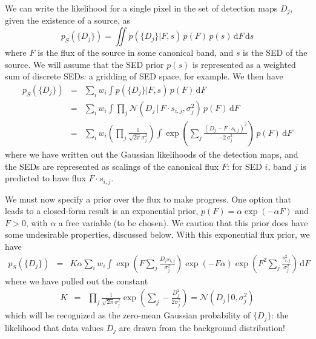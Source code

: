 \documentclass[letterpaper,preprint]{aastex62}
\newcommand{\gaussianN}{\mathcal{N}}
\newcommand{\gaussian}[1]{\gaussianN\!\left(#1\right)}
\newcommand{\dd}{\mathrm{d}}
\begin{document}
We can write the likelihood for a single pixel in the set of detection
maps $D_j$, given the existence of a source, as
\begin{equation}
  p_S(\{ D_j \}) = \iint p(\{ D_j \} | F, s) \, p(F) \, p(s) \, \dd F \, \dd s
\end{equation}
where $F$ is the flux of the source in some canonical band, and $s$ is
the SED of the source.  We will assume that the SED prior $p(s)$ is
represented as a weighted sum of discrete SEDs: a gridding of SED
space, for example.  We then have
\begin{eqnarray}
  p_S(\{ D_j \})
  &=&
  \sum_{i} w_i \int p(\{ D_j \} | F, s) \, p(F) \, \dd F
  \\
  &=&
  \sum_i w_i \int \prod_j \gaussian{D_j \,|\, F \cdot s_{i,j}, \sigma_j^2} \, p(F) \, \dd F
  \\
  &=&
  \sum_i w_i 
  \left( \prod_j \frac{1}{\sqrt{2 \pi} \sigma_j^2} \right)
  \int 
    \exp{ \left( \sum_j \frac{(D_j - F \cdot s_{i,j})^2}{-2 \, \sigma_j^2} \right) }
    \, p(F) \, \dd F
\end{eqnarray}
%
where we have written out the Gaussian likelihoods of the detection
maps, and the SEDs are represented as scalings of the canonical flux
$F$: for SED $i$, band $j$ is predicted to have flux $F \cdot
s_{i,j}$.

We must now specify a prior over the flux to make progress.  One
option that leads to a closed-form result is an exponential prior,
$p(F) = \alpha \exp(-\alpha F)$ and $F > 0$, with $\alpha$ a free
variable (to be chosen).  We caution that this prior does have some
undesirable properties, discussed below.  With this exponential flux
prior, we have
\begin{eqnarray}
  p_S(\{ D_j \})
  &=&
  K \alpha
  \sum_i w_i 
  \int 
    \exp{ \left( F \sum_j \frac{D_j s_{i,j}}{\sigma_j^2} \right)}
    \exp{ \left( -F \alpha \right)}
    \exp{ \left( F^2 \sum_j \frac{s_{i,j}^2}{\sigma_j^2} \right)}
    \, \dd F
\end{eqnarray}
where we have pulled out the constant
\begin{eqnarray}
K &=& \prod_j \frac{1}{\sqrt{2 \pi} \sigma_j^2} 
\exp{\left( \sum_j -\frac{D_j^2}{2 \sigma_j^2} \right)}
= \gaussian{D_j \,|\, 0, \sigma_j^2}
\label{eq:pbg}
\end{eqnarray}
which will be recognized as the zero-mean Gaussian probability of
$\{D_j\}$: the likelihood that data values $D_j$ are drawn from the
background distribution!
\end{document}
